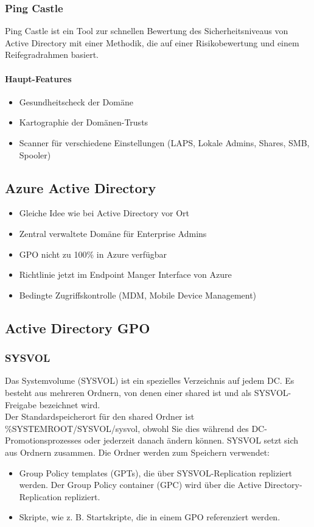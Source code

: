 \subsubsection{Ping Castle}\label{par:ping-castle}
Ping Castle ist ein Tool zur schnellen Bewertung des Sicherheitsniveaus von Active Directory mit einer Methodik, die auf einer Risikobewertung und einem Reifegradrahmen basiert.\\
\paragraph{Haupt-Features}
\begin{itemize}
  \item Gesundheitscheck der Domäne
  \item Kartographie der Domänen-Trusts
  \item Scanner für verschiedene Einstellungen (LAPS, Lokale Admins, Shares, SMB, Spooler)
\end{itemize}

\subsection{Azure Active Directory}
\begin{itemize}
  \item Gleiche Idee wie bei Active Directory vor Ort
  \item Zentral verwaltete Domäne für Enterprise Admins
  \item GPO nicht zu 100\% in Azure verfügbar
  \item Richtlinie jetzt im Endpoint Manger Interface von Azure
  \item Bedingte Zugriffskontrolle (MDM, Mobile Device Management)
\end{itemize}



\subsection{Active Directory GPO}
\subsubsection{SYSVOL}
Das Systemvolume (SYSVOL) ist ein spezielles Verzeichnis auf jedem DC.
Es besteht aus mehreren Ordnern, von denen einer shared ist und als SYSVOL-Freigabe bezeichnet wird.\\

Der Standardspeicherort für den shared Ordner ist \%SYSTEMROOT/SYSVOL/sysvol, obwohl Sie dies während des DC-Promotionsprozesses oder jederzeit danach ändern können.
SYSVOL setzt sich aus Ordnern zusammen. 
Die Ordner werden zum Speichern verwendet:
\begin{itemize}
  \item Group Policy templates (GPTs), die über SYSVOL-Replication repliziert werden. Der Group Policy container (GPC) wird über die Active Directory-Replication repliziert.
  \item Skripte, wie z. B. Startskripte, die in einem GPO referenziert werden.
\end{itemize}

